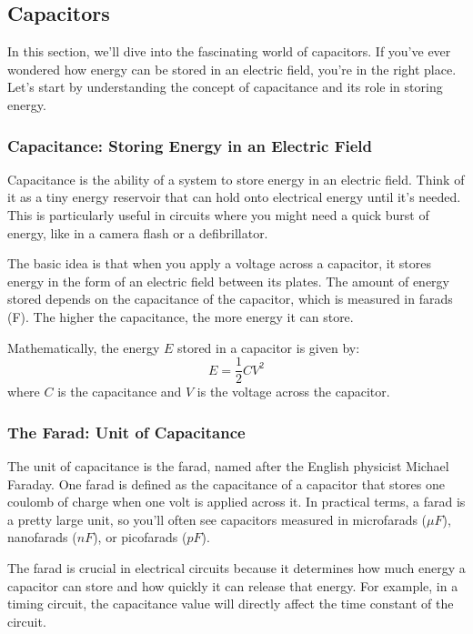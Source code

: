 \subsection{Capacitors}
\label{subsec:capacitors}

In this section, we'll dive into the fascinating world of capacitors. If you've ever wondered how energy can be stored in an electric field, you're in the right place. Let's start by understanding the concept of capacitance and its role in storing energy.

\subsubsection*{Capacitance: Storing Energy in an Electric Field}

Capacitance is the ability of a system to store energy in an electric field. Think of it as a tiny energy reservoir that can hold onto electrical energy until it's needed. This is particularly useful in circuits where you might need a quick burst of energy, like in a camera flash or a defibrillator.

The basic idea is that when you apply a voltage across a capacitor, it stores energy in the form of an electric field between its plates. The amount of energy stored depends on the capacitance of the capacitor, which is measured in farads (F). The higher the capacitance, the more energy it can store.

Mathematically, the energy \( E \) stored in a capacitor is given by:
\begin{equation}
    E = \frac{1}{2} C V^2
\end{equation}
where \( C \) is the capacitance and \( V \) is the voltage across the capacitor.

\subsubsection*{The Farad: Unit of Capacitance}

The unit of capacitance is the farad, named after the English physicist Michael Faraday. One farad is defined as the capacitance of a capacitor that stores one coulomb of charge when one volt is applied across it. In practical terms, a farad is a pretty large unit, so you'll often see capacitors measured in microfarads (\( \mu F \)), nanofarads (\( nF \)), or picofarads (\( pF \)).

The farad is crucial in electrical circuits because it determines how much energy a capacitor can store and how quickly it can release that energy. For example, in a timing circuit, the capacitance value will directly affect the time constant of the circuit.


